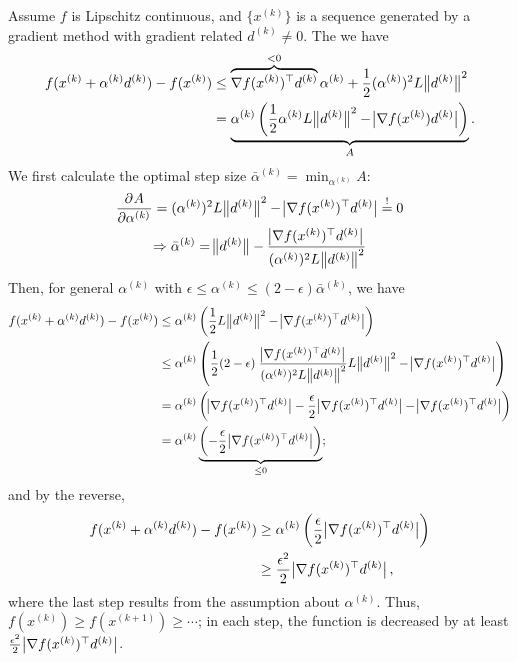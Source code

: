 \documentclass{article}
\newcommand{\T}[1]{#1^{\top}}
\newcommand{\kth}[2][k]{#2^{(#1)}}
\begin{document}
Assume \(f\) is Lipschitz continuous, and \(\{\kth{x}\}\) is a sequence generated by a gradient
method with gradient related \(\kth{d} \neq 0\).  The we have
\begin{align*}
  f(\kth{x} + \kth{\alpha}\kth{d}) - f(\kth{x})
  &\leq \overbrace{\T{\nabla f(\kth{x})} \kth{d}}^{< 0} \kth{\alpha} +
    \frac{1}{2} (\kth{\alpha})^2 L \enVert[1]{\kth{d}}^2 \\
  &= \underbrace{\kth{\alpha} \left( \frac{1}{2} \kth{\alpha} L \enVert[1]{\kth{d}}^2
    - \envert[1]{\nabla f(\kth{x}) \kth{d}} \right)}_{A}.
\end{align*}
We first calculate the optimal step size \(\kth{\bar{\alpha}} = \min_{\kth{\alpha}} A\):
\begin{gather*}
  \dpd{A}{{\kth{\alpha}}} = (\kth{\alpha})^2 L \enVert[1]{\kth{d}}^2 - \envert[1]{\T{\nabla
                            f(\kth{x})} \kth{d}} \overset{!}{=} 0 \\
  \Rightarrow \kth{\bar{\alpha}} = \enVert[1]{\kth{d}} - \frac{\envert[1]{\T{\nabla
                       f(\kth{x})} \kth{d}}}{(\kth{\alpha})^2 L \enVert[1]{\kth{d}}^2}
\end{gather*}
Then, for general \(\kth{\alpha}\) with
\(\epsilon \leq \kth{\alpha} \leq (2 - \epsilon)\kth{\bar{\alpha}}\), we have
\begin{align*}
  f(\kth{x} + \kth{\alpha}\kth{d}) - f(\kth{x})
  &\leq \kth{\alpha} \left( \frac{1}{2} L \enVert[1]{\kth{d}}^2
    - \envert[1]{\T{\nabla f(\kth{x})} \kth{d}} \right) \\
  &\leq \kth{\alpha} \left( \frac{1}{2} (2 - \epsilon)\; \frac{\envert[1]{\T{\nabla
    f(\kth{x})} \kth{d}}}{(\kth{\alpha})^2 L \enVert[1]{\kth{d}}^2} L \enVert[1]{\kth{d}}^2
    - \envert[1]{\T{\nabla f(\kth{x})} \kth{d}} \right) \\
  &= \kth{\alpha} \left( \envert[1]{\T{\nabla f(\kth{x})} \kth{d}}
    - \frac{\epsilon}{2} \envert[1]{\T{\nabla f(\kth{x})} \kth{d}}
    - \envert[1]{\T{\nabla f(\kth{x})} \kth{d}} \right) \\
  &= \kth{\alpha} \underbrace{\left( -\frac{\epsilon}{2}\envert[1]{\T{\nabla f(\kth{x})} \kth{d}}
    \right)}_{\leq 0};
\end{align*}
and by the reverse,
\begin{align*}
  f(\kth{x} + \kth{\alpha}\kth{d}) - f(\kth{x})
  &\geq \kth{\alpha} \left(\frac{\epsilon}{2}\envert[1]{\T{\nabla f(\kth{x})} \kth{d}} \right) \\
  &\geq \frac{\epsilon^2}{2}\envert[1]{\T{\nabla f(\kth{x})} \kth{d}},
\end{align*}
where the last step results from the assumption about \(\kth{\alpha}\).  Thus,
\(f(\kth{x}) \geq f(\kth[k+1]{x}) \geq \cdots \); in each step, the function is decreased by at
least \(\frac{\epsilon^2}{2}\envert[1]{\T{\nabla f(\kth{x})} \kth{d}}\).
\end{document}
